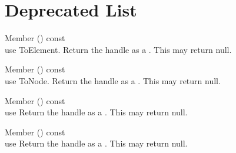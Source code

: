 \chapter{Deprecated List }
\hypertarget{deprecated}{}\label{deprecated}

\begin{DoxyRefList}
\item[Member \doxylink{classTiXmlHandle_ac56814c76757eecc5bd951d3ed710dd2}{Ti\+Xml\+Handle\+::Element} () const]\hfill \\
\label{deprecated__deprecated000002}%
%
use To\+Element. Return the handle as a . This may return null.  
\item[Member \doxylink{classTiXmlHandle_afa2eb82bacfb6e4c3dd5351ce28e5d7a}{Ti\+Xml\+Handle\+::Node} () const]\hfill \\
\label{deprecated__deprecated000001}%
%
use To\+Node. Return the handle as a . This may return null.  
\item[Member \doxylink{classTiXmlHandle_a58a9b3e3d710a603038e6e291eb6d580}{Ti\+Xml\+Handle\+::Text} () const]\hfill \\
\label{deprecated__deprecated000003}%
%
use  Return the handle as a . This may return null.  
\item[Member \doxylink{classTiXmlHandle_aa7a8756af3ac24f0b2d469e500b85824}{Ti\+Xml\+Handle\+::Unknown} () const]\hfill \\
\label{deprecated__deprecated000004}%
%
use  Return the handle as a . This may return null. 
\end{DoxyRefList}